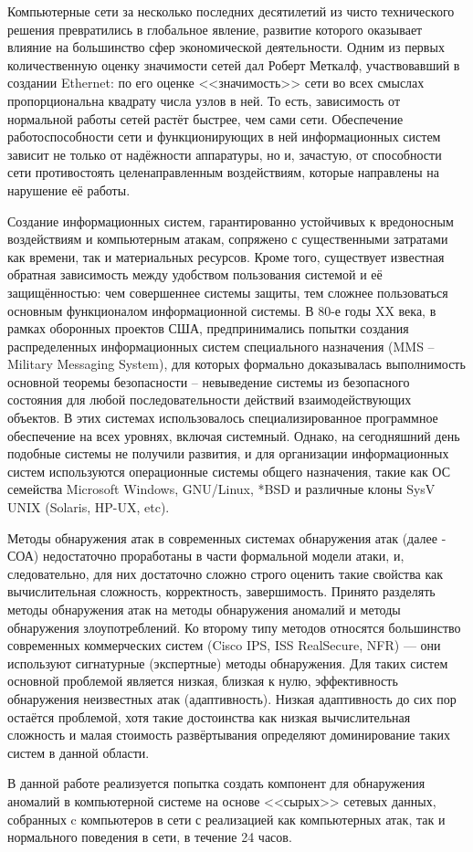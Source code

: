 Компьютерные сети за несколько последних десятилетий из чисто технического решения превратились в глобальное явление, развитие которого оказывает влияние на большинство сфер экономической деятельности. Одним из первых количественную оценку значимости сетей дал Роберт Меткалф, участвовавший в создании Ethernet: по его оценке <<значимость>> сети во всех смыслах пропорциональна квадрату числа узлов в ней. То есть, зависимость от нормальной работы сетей растёт быстрее, чем сами сети. Обеспечение работоспособности сети и функционирующих в ней информационных систем зависит не только от надёжности аппаратуры, но и, зачастую, от способности сети противостоять целенаправленным воздействиям, которые направлены на нарушение её работы.

Создание информационных систем, гарантированно устойчивых к вредоносным воздействиям и компьютерным атакам, сопряжено с существенными затратами как времени, так и материальных ресурсов. Кроме того, существует известная обратная зависимость между удобством пользования системой и её защищённостью: чем совершеннее системы защиты, тем сложнее пользоваться основным функционалом информационной системы. В 80-е годы XX века, в рамках оборонных проектов США, предпринимались попытки создания распределенных информационных систем специального назначения (MMS – Military Messaging System), для которых формально доказывалась выполнимость основной теоремы безопасности – невыведение системы из безопасного состояния для любой последовательности действий взаимодействующих объектов. В этих системах использовалось специализированное программное обеспечение на всех уровнях, включая системный. Однако, на сегодняшний день подобные системы не получили развития, и для организации информационных систем используются операционные системы общего назначения, такие как ОС семейства Microsoft Windows, GNU/Linux, *BSD и различные клоны SysV UNIX (Solaris, HP-UX, etc).

Методы обнаружения атак в современных системах обнаружения атак (далее - СОА) недостаточно проработаны в части формальной модели атаки, и, следовательно, для них достаточно сложно строго оценить такие свойства как вычислительная сложность, корректность, завершимость. Принято разделять методы обнаружения атак на методы обнаружения аномалий и методы обнаружения злоупотреблений. Ко второму типу методов относятся большинство современных коммерческих систем (Cisco IPS, ISS RealSecure, NFR) --- они используют сигнатурные (экспертные) методы обнаружения. Для таких систем основной проблемой является низкая, близкая к нулю, эффективность обнаружения неизвестных атак (адаптивность). Низкая адаптивность до сих пор остаётся проблемой, хотя такие достоинства как низкая вычислительная сложность и малая стоимость развёртывания определяют доминирование таких систем в данной области.

В данной работе реализуется попытка создать компонент для обнаружения аномалий в компьютерной системе на основе <<сырых>> сетевых данных, собранных c компьютеров в сети с реализацией как компьютерных атак, так и нормального поведения в сети, в течение 24 часов.
